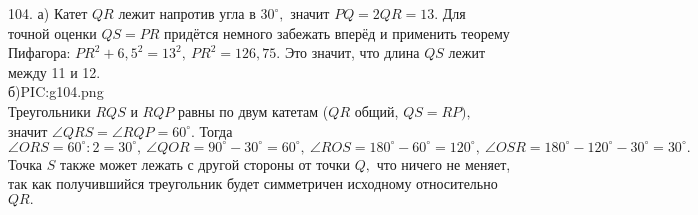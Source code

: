 104. а) Катет $QR$ лежит напротив угла в $30^\circ,$ значит $PQ=2QR=13.$ Для точной оценки $QS=PR$ придётся немного забежать вперёд и применить теорему Пифагора: $PR^2+6,5^2=13^2,\ PR^2=126,75.$ Это значит, что длина $QS$ лежит между 11 и 12.\\
б){{PIC:g104.png}}\\
Треугольники $RQS$ и $RQP$ равны по двум катетам ($QR$ общий, $QS=RP),$ значит $\angle QRS=\angle RQP=60^\circ.$ Тогда $\angle ORS=60^\circ:2=30^\circ,\ \angle QOR=90^\circ-30^\circ=60^\circ,\ \angle ROS=180^\circ-60^\circ=120^\circ,\ \angle OSR=180^\circ-120^\circ-30^\circ=30^\circ.$ Точка $S$ также может лежать с другой стороны от точки $Q,$ что ничего не меняет, так как получившийся треугольник будет симметричен исходному относительно $QR.$\\
